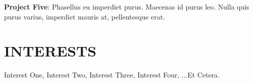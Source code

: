 \documentclass[margin]{res}
\begin{document}
\begin{resume}
\par
\textbf{Project Five}: 
Phasellus eu imperdiet purus. Maecenas id purus leo. Nulla quis purus varius, 
imperdiet mauris at, pellentesque erat. 


\section{INTERESTS}
Interest One, Interest Two, Interest Three, Interest Four, ...Et Cetera.
\end{resume}
\end{document}
